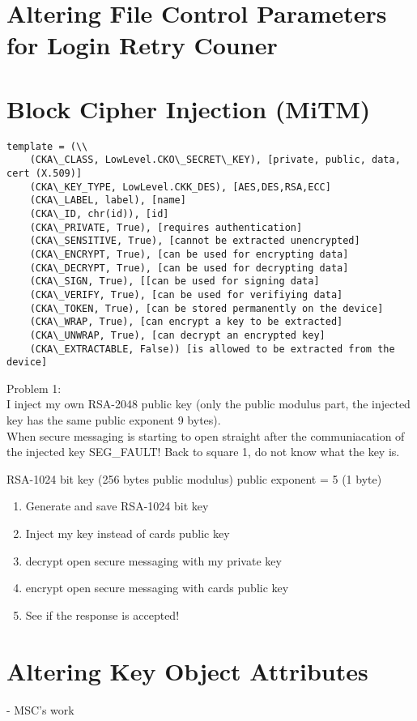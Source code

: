 \documentclass[bsc,frontabs,twoside,singlespacing,parskip,deptreport]{infthesis}     %
\begin{document}
\section{Altering File Control Parameters for Login Retry Couner}

\section{Block Cipher Injection (MiTM)}
\begin{verbatim}
template = (\\
	(CKA\_CLASS, LowLevel.CKO\_SECRET\_KEY), [private, public, data, cert (X.509)]
	(CKA\_KEY_TYPE, LowLevel.CKK_DES), [AES,DES,RSA,ECC]
	(CKA\_LABEL, label), [name]
	(CKA\_ID, chr(id)), [id]
	(CKA\_PRIVATE, True), [requires authentication]
	(CKA\_SENSITIVE, True), [cannot be extracted unencrypted]
	(CKA\_ENCRYPT, True), [can be used for encrypting data]
	(CKA\_DECRYPT, True), [can be used for decrypting data]
	(CKA\_SIGN, True), [[can be used for signing data]
	(CKA\_VERIFY, True), [can be used for verifiying data]
	(CKA\_TOKEN, True), [can be stored permanently on the device]
	(CKA\_WRAP, True), [can encrypt a key to be extracted]
	(CKA\_UNWRAP, True), [can decrypt an encrypted key]
	(CKA\_EXTRACTABLE, False)) [is allowed to be extracted from the device]
\end{verbatim}

Problem 1:\\
I inject my own RSA-2048 public key (only the public modulus part, the injected key has the same public exponent 9 bytes).\\
When secure messaging is starting to open straight after the communiacation of the injected key SEG\_FAULT!
Back to square 1, do not know what the key is.

RSA-1024 bit key (256 bytes public modulus)
public exponent = 5 (1 byte)

\newpage
\begin{enumerate}
\item Generate and save RSA-1024 bit key
\item Inject my key instead of cards public key
\item decrypt open secure messaging with my private key
\item encrypt open secure messaging with cards public key
\item See if the response is accepted!
\end{enumerate}

\section{Altering Key Object Attributes}
- MSC's work
\end{document}

